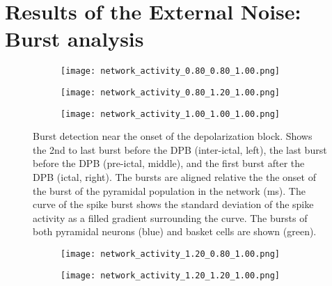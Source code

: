 \section{Results of the External Noise: Burst analysis}
\begin{figure}[!htb]
    \centering
    \begin{subfigure}{\textwidth}
        \texttt{[image: network\_activity\_0.80\_0.80\_1.00.png]}
        \caption{} %
    \end{subfigure}
    \vspace{1em} %

    \begin{subfigure}{\textwidth}
        \texttt{[image: network\_activity\_0.80\_1.20\_1.00.png]}
        \caption{} %
    \end{subfigure}
    \vspace{1em} %

    \begin{subfigure}{\textwidth}
        \texttt{[image: network\_activity\_1.00\_1.00\_1.00.png]}
        \caption{} %
    \end{subfigure}

    \caption{Burst detection near the onset of the depolarization block. Shows the 2nd to last burst before the DPB (inter-ictal, left), 
    the last burst before the DPB (pre-ictal, middle), and the first burst after the DPB (ictal, right). 
    The bursts are aligned relative the the onset of the burst of the pyramidal population in the network (ms). 
    The curve of the spike burst shows the standard deviation of the spike activity as a filled gradient surrounding the curve. 
    The bursts of both pyramidal neurons (blue) and basket cells are shown (green).}\label{fig:burst_detection}
\end{figure}
\clearpage %

\begin{figure}[!htb] \ContinuedFloat%
    \centering
    \begin{subfigure}{\textwidth}
        \texttt{[image: network\_activity\_1.20\_0.80\_1.00.png]}
        \caption{} %
    \end{subfigure}
    \vspace{1em} %

    \begin{subfigure}{\textwidth}
        \texttt{[image: network\_activity\_1.20\_1.20\_1.00.png]}
        \caption{} %
    \end{subfigure}

\end{figure}

